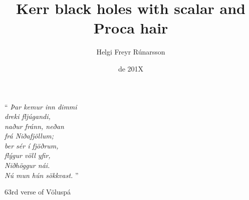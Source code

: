 \documentclass[11pt,a4paper,twoside,openright]{book}
\title{Kerr black holes with scalar and Proca hair
}
\author{Helgi Freyr Rúnarsson}
\date{de 201X}
\let\origdoublepage\cleardoublepage
\newcommand{\clearemptydoublepage}{%
  \clearpage
  {\pagestyle{empty}\origdoublepage}%
}
\let\cleardoublepage\clearemptydoublepage
\begin{document}
\pagestyle{plain}

\coverp
\titlep
\dedication
\jury



\cleardoublepage

\cleardoublepage
\tableofcontents
\cleardoublepage
\listoffigures
\cleardoublepage


\pagestyle{headings}












\cleardoublepage
\newpage
\thispagestyle{empty}
\epigraph{``\emph{
Þar kemur inn dimmi \\
dreki fljúgandi, \\
naður fránn, neðan \\
frá Niðafjöllum; \\
ber sér í fjöðrum, \\
flýgur völl yfir, \\
Niðhöggur nái. \\
Nú mun hún sökkvast. 
} 
''}{63rd verse of Völuspá}
\cleardoublepage


\appendix






\cleardoublepage
{}
{}


\end{document}
